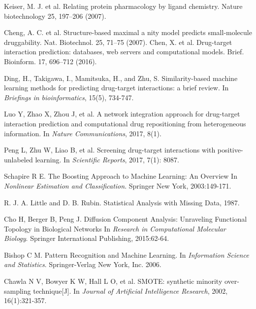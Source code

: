 \documentclass[conference]{IEEEtran}
\begin{document}
\begin{thebibliography}{10}

Keiser, M. J. et al. Relating protein pharmacology by ligand chemistry. Nature biotechnology 25, 197–206 (2007).

Cheng, A. C. et al. Structure-based maximal a nity model predicts small-molecule druggability. Nat. Biotechnol. 25, 71–75 (2007).
Chen, X. et al. Drug-target interaction prediction: databases, web servers and computational models. Brief. Bioinform. 17, 696–712 (2016).

Ding, H., Takigawa, I., Mamitsuka, H., and Zhu, S.
\newblock Similarity-based machine learning methods for predicting drug-target interactions: a brief review. \newblock In {\em Briefings in bioinformatics}, 15(5), 734-747.


Luo Y, Zhao X, Zhou J, et al.
\newblock A network integration approach for drug-target interaction prediction and computational drug repositioning from heterogeneous information.
\newblock In {\em Nature Communications}, 2017, 8(1).


Peng L, Zhu W, Liao B, et al.
\newblock Screening drug-target interactions with positive-unlabeled learning.
\newblock In {\em Scientific Reports}, 2017, 7(1): 8087.



Schapire R E. 
\newblock The Boosting Approach to Machine Learning: An Overview
\newblock In {\em Nonlinear Estimation and Classification}. Springer New York, 2003:149-171.

R. J. A. Little and D. B. Rubin.
\newblock Statistical Analysis with Missing Data, 1987.

Cho H, Berger B, Peng J. 
\newblock Diffusion Component Analysis: Unraveling Functional Topology in Biological Networks
\newblock In {\em Research in Computational Molecular Biology}. Springer International Publishing, 2015:62-64.


Bishop C M. 
\newblock Pattern Recognition and Machine Learning. 
\newblock In {\em Information Science and Statistics}. Springer-Verlag New York, Inc. 2006.

Chawla N V, Bowyer K W, Hall L O, et al. \newblock SMOTE: synthetic minority over-sampling technique[J].
\newblock In {\em Journal of Artificial Intelligence Research}, 2002, 16(1):321-357.




\end{thebibliography}
\end{document}
